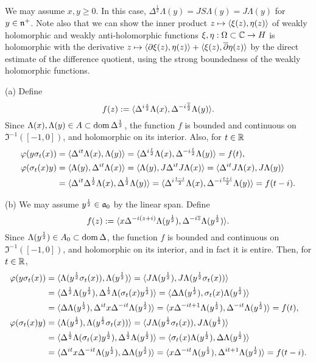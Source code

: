 \documentclass{../../../small}
\begin{document}
\begin{pf}
We may assume $x,y\ge0$.
In this case, $\Delta^{\frac12}\Lambda(y)=JS\Lambda(y)=J\Lambda(y)$ for $y\in\mathfrak{n}^+$.
Note also that we can show the inner product $z\mapsto\langle\xi(z),\eta(z)\rangle$ of weakly holomorphic and weakly anti-holomorphic functions $\xi,\eta:\Omega\subset\mathbb{C}\to H$ is holomorphic with the derivative $z\mapsto\langle\partial\xi(z),\eta(z)\rangle+\langle\xi(z),\overline\partial\eta(z)\rangle$ by the direct estimate of the difference quotient, using the strong boundedness of the weakly holomorphic functions.

(a)
Define
\[f(z):=\langle\Delta^{i\frac z2}\Lambda(x),\Delta^{-i\frac{\overline z}2}\Lambda(y)\rangle.\]
Since $\Lambda(x),\Lambda(y)\in A\subset\operatorname{dom}\Delta^{\frac12}$, the function $f$ is bounded and continuous on $\Im^{-1}([-1,0])$, and holomorphic on its interior.
Also, for $t\in\mathbb{R}$
\begin{align*}
\varphi(y\sigma_t(x))
&=\langle\Delta^{it}\Lambda(x),\Lambda(y)\rangle
=\langle\Delta^{i\frac t2}\Lambda(x),\Delta^{-i\frac t2}\Lambda(y)\rangle
=f(t),\\
\varphi(\sigma_t(x)y)
&=\langle\Lambda(y),\Delta^{it}\Lambda(x)\rangle
=\langle\Lambda(y),J\Delta^{it}J\Lambda(x)\rangle
=\langle\Delta^{it}J\Lambda(x),J\Lambda(y)\rangle\\
&=\langle\Delta^{it}\Delta^{\frac12}\Lambda(x),\Delta^{\frac12}\Lambda(y)\rangle
=\langle\Delta^{i\frac{t-i}2}\Lambda(x),\Delta^{-i\frac{t+i}2}\Lambda(y)\rangle
=f(t-i).
\end{align*}

(b)
We may assume $y^{\frac12}\in\mathfrak{a}_0$ by the linear span.
Define
\[f(z):=\langle x\Delta^{-i(z+i)}\Lambda(y^{\frac12}),\Delta^{-i\overline z}\Lambda(y^{\frac12})\rangle.\]
Since $\Lambda(y^{\frac12})\in A_0\subset\operatorname{dom}\Delta$, the function $f$ is bounded and continuous on $\Im^{-1}([-1,0])$, and holomorphic on its interior, and in fact it is entire.
Then, for $t\in\mathbb{R}$,
\begin{align*}
\varphi(y\sigma_t(x))
&=\langle\Lambda(y^{\frac12}\sigma_t(x)),\Lambda(y^{\frac12})\rangle
=\langle J\Lambda(y^{\frac12}),J\Lambda(y^{\frac12}\sigma_t(x))\rangle\\
&=\langle\Delta^{\frac12}\Lambda(y^{\frac12}),\Delta^{\frac12}\Lambda(\sigma_t(x)y^{\frac12})\rangle
=\langle\Delta\Lambda(y^{\frac12}),\sigma_t(x)\Lambda(y^{\frac12})\rangle\\
&=\langle\Delta\Lambda(y^{\frac12}),\Delta^{it}x\Delta^{-it}\Lambda(y^{\frac12})\rangle
=\langle x\Delta^{-it+1}\Lambda(y^{\frac12}),\Delta^{-it}\Lambda(y^{\frac12})\rangle
=f(t),\\
\varphi(\sigma_t(x)y)
&=\langle\Lambda(y^{\frac12}),\Lambda(y^{\frac12}\sigma_t(x))\rangle
=\langle J\Lambda(y^{\frac12}\sigma_t(x)),J\Lambda(y^{\frac12})\rangle\\
&=\langle\Delta^{\frac12}\Lambda(\sigma_t(x)y^{\frac12}),\Delta^{\frac12}\Lambda(y^{\frac12})\rangle
=\langle\sigma_t(x)\Lambda(y^{\frac12}),\Delta\Lambda(y^{\frac12})\rangle\\
&=\langle\Delta^{it}x\Delta^{-it}\Lambda(y^{\frac12}),\Delta\Lambda(y^{\frac12})\rangle
=\langle x\Delta^{-it}\Lambda(y^{\frac12}),\Delta^{it+1}\Lambda(y^{\frac12})\rangle
=f(t-i).
\end{align*}


\end{pf}
\end{document}
